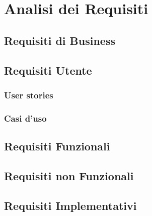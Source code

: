 
\chapter{Analisi dei Requisiti}
	\section{Requisiti di Business}
	
	\section{Requisiti Utente}
        \subsection{User stories}
	    \subsection{Casi d'uso}
	\section{Requisiti Funzionali}
	\section{Requisiti non Funzionali}
	\section{Requisiti Implementativi}
